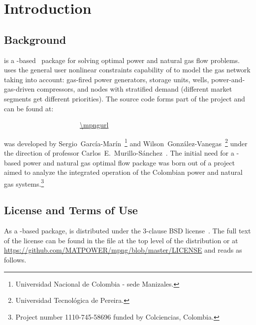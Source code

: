 \normalsize
{}
\setcounter{page}{1}

\chapter{Introduction}
\label{chap:intro}

\section{Background}
\label{sec:background}

\mpng{} is a \matpower{}-based~\cite{zimmerman2011,matpower} package for solving optimal power and natural gas flow problems. \mpng{} uses the general user nonlinear constraints capability of \matpower{} to model the gas network taking into account: gas-fired power generators, storage units, wells, power-and-gas-driven compressors, and nodes with stratified demand (different market segments get different priorities). The \mpng{} source code forms part of the \matpower{} project and can be found at:

\bigskip
~~~~~~~~~~~~~~~~~~~~~~\url{\mpngurl}
\bigskip

\noindent \mpng{} was developed by Sergio~García-Marín~\footnote[1]{ Universidad Nacional de Colombia - sede Manizales.\label{foot:UNAL}} and Wilson~González-Vanegas~\footnote[2]{ Universidad Tecnológica de Pereira.\label{foot:UTP}} under the direction of professor Carlos~E.~Murillo-S\'anchez~. The initial need for a \matpower{}-based power and natural gas optimal flow package was born out of a project aimed to analyze the integrated operation of the Colombian power and natural gas systems.\footnote[3]{ Project number 1110-745-58696 funded by Colciencias, Colombia.}

\section{License and Terms of Use}
\label{sec:license}

As a \matpower{}-based package, \mpng{} is distributed under the 3-clause BSD license~\cite{bsd}. The full text of the license can be found in the  file at the top level of the distribution or at \url{https://github.com/MATPOWER/mpng/blob/master/LICENSE} and reads as follows. 

